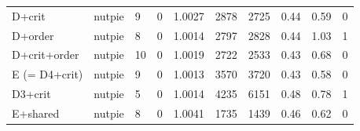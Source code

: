 \begin{tabular}{@{}lllrrrrrrr@{}}
D+crit & nutpie & 9 & 0 & 1.0027 & 2878 & 2725 & 0.44 & 0.59 & 0 \\
D+order & nutpie & 8 & 0 & 1.0014 & 2797 & 2828 & 0.44 & 1.03 & 1 \\
D+crit+order & nutpie & 10 & 0 & 1.0019 & 2722 & 2533 & 0.43 & 0.68 & 0 \\
E (= D4+crit) & nutpie & 9 & 0 & 1.0013 & 3570 & 3720 & 0.43 & 0.58 & 0 \\
D3+crit & nutpie & 5 & 0 & 1.0014 & 4235 & 6151 & 0.48 & 0.78 & 1 \\
E+shared & nutpie & 8 & 0 & 1.0041 & 1735 & 1439 & 0.46 & 0.62 & 0 \\
\bottomrule
\end{tabular}
